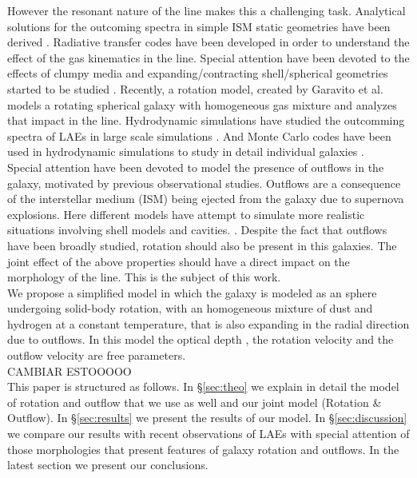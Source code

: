 \documentclass{latex/emulateapj}
\begin{document}
However the resonant nature of the line makes this a challenging task. Analytical solutions for the outcoming spectra in simple ISM static geometries have been derived \cite{Adams72, Harrington73, Neufeld90, Dijkstra06}. Radiative transfer codes \citep{DijkstraKramer, Laursen09, Verhamme06, CLARA} have been developed in order to understand the effect of the gas kinematics in the \lya line. Special attention have been devoted to  the effects of clumpy media \citep{Hansen06} and expanding/contracting shell/spherical geometries started to be studied \citep{Ahn03,Verhamme06,Dijkstra06}. Recently, a rotation model, created by Garavito et al. \cite{Garavito14} models
a rotating spherical galaxy with homogeneous gas mixture and analyzes that impact in the \lya line. Hydrodynamic simulations have studied the outcomming spectra of LAEs in large scale simulations \cite{Forero12}. And Monte Carlo codes have been used in hydrodynamic simulations to study in detail individual galaxies \citep{Laursen09,Barnes11,Verhamme12,Yajima12}.\\

Special attention have been devoted to model the presence of outflows in the galaxy, motivated by previous observational studies. Outflows are a consequence of the interstellar medium (ISM) being ejected from the galaxy due to supernova explosions. Here different models have attempt to simulate more realistic situations involving shell models and cavities. \citep{Behrens2014}. Despite the fact that outflows have been broadly studied, rotation should also be present in this galaxies. The joint effect of the above properties should have a direct impact on the morphology of the \lya line. This is the subject of this work. \\

We propose a simplified model in which the galaxy is modeled as an sphere undergoing solid-body rotation, with an homogeneous mixture of dust and hydrogen at a constant temperature, that is also expanding in the radial direction due to outflows. In this model the optical depth \tauh, the  rotation velocity \vrot and the outflow velocity \vout are free parameters. \\
 
CAMBIAR ESTOOOOO\\ 
 
This paper is structured as follows. In \S \ref{sec:theo} we explain in detail the model of rotation and outflow that we use as well and our joint model (Rotation \& Outflow). In \S \ref{sec:results} we present the results of our model. In \S \ref{sec:discussion} we compare our results with recent observations of LAEs with special attention of those morphologies that present features of galaxy rotation and outflows. In the latest section we present our conclusions.  \\
\end{document}
